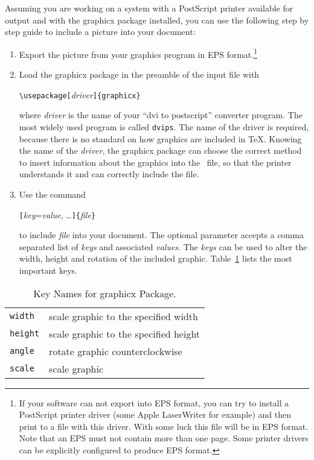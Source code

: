 \newpage
Assuming you are working on a system with a
PostScript printer available for output and with the \textsf{graphicx}
package installed, you can use the following step by step guide to
include a picture into your document:

\begin{enumerate}
\item Export the picture from your graphics program in EPS
  format.\footnote{If your software can not export into EPS format, you
    can try to install a PostScript printer driver (some Apple
    LaserWriter for example) and then print to a file with this
    driver. With some luck this file will be in EPS format. Note that
    an EPS must not contain more than one page. Some printer drivers
    can be explicitly configured to produce EPS format.}
\item Load the \textsf{graphicx} package in the preamble of the input
  file with
\begin{lscommand}
\verb|\usepackage[|\emph{driver}\verb|]{graphicx}|
\end{lscommand}
where \emph{driver} is the name of your ``dvi to postscript''
converter program. The most
widely used program is called \texttt{dvips}. The name of the driver is
required, because there is no standard on how graphics are included in
\TeX{}. Knowing the name of the \emph{driver}, the
\textsf{graphicx} package can choose the correct method to insert
information about the graphics into the ~file, so that the
printer understands it and can correctly include the  file.
\item Use the command 
\begin{lscommand}
\verb|[|\emph{key}=\emph{value}, \ldots\verb|]{|\emph{file}\verb|}|
\end{lscommand}
to include \emph{file} into your document. The optional parameter
accepts a comma separated list of \emph{keys} and associated
\emph{values}. The \emph{keys} can be used to alter the width, height
and rotation of the included graphic. Table~\ref{keyvals} lists the
most important keys.
\end{enumerate}

\begin{table}[htb]
\caption{Key Names for \textsf{graphicx} Package.}
\label{keyvals}
\begin{lined}{9cm}
\begin{tabular}{@{}ll}
\texttt{width}& scale graphic to the specified width\\
\texttt{height}& scale graphic to the specified height\\
\texttt{angle}& rotate graphic counterclockwise\\
\texttt{scale}& scale graphic \\
\end{tabular}

\bigskip
\end{lined}
\end{table}

